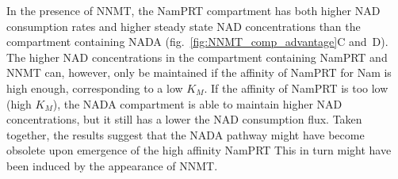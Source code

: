 In the presence of NNMT, the NamPRT compartment has both higher NAD consumption rates and higher steady state NAD concentrations than the compartment containing NADA (fig.~\ref{fig:NNMT_comp_advantage}C and~D). The higher NAD concentrations in the compartment containing NamPRT and NNMT can, however, only be maintained  if the affinity of NamPRT for Nam is high enough, corresponding to a low $K_{M}$. If the affinity of NamPRT is too low (high $K_{M}$), the NADA compartment is able to maintain higher NAD concentrations, but it still has a lower the NAD consumption flux.  Taken together, the results suggest that the NADA pathway might have become obsolete upon emergence of the  high affinity NamPRT This in turn might have been induced by the appearance of NNMT.
